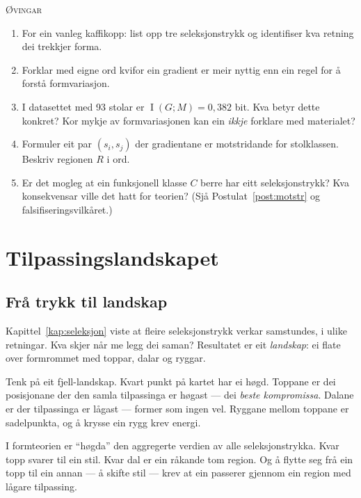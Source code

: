 \documentclass[10pt]{book}
\theoremstyle{definition}
\theoremstyle{plain}
\theoremstyle{remark}
\newenvironment{ovingar}%
  {\medskip\noindent\textsc{\O vingar}\begin{enumerate}[leftmargin=2em]}%
  {\end{enumerate}\medskip}
\DeclareMathOperator{\MI}{I}
\begin{document}
\begin{ovingar}
  \item[\textbf{a)}] For ein vanleg kaffikopp: list opp tre seleksjonstrykk og identifiser kva retning dei trekkjer forma.
  \item[\textbf{a)}] Forklar med eigne ord kvifor ein gradient er meir nyttig enn ein regel for \aa{} forst\aa{} formvariasjon.
  \item[\textbf{b)}] I datasett\-et med 93 stolar er $\MI(G; M) = 0{,}382$ bit. Kva betyr dette konkret? Kor mykje av formvariasjonen kan ein \emph{ikkje} forklare med materialet?
  \item[\textbf{b)}] Formuler eit par $(s_i, s_j)$ der gradientane er motstridande for stolklassen. Beskriv regionen $R$ i ord.
  \item[\textbf{c)}] Er det mogleg at ein funksjonell klasse $C$ berre har eitt seleksjonstrykk? Kva konsekvensar ville det hatt for teorien? (Sjå Postulat~\ref{post:motstr} og falsifiseringsvilk\aa ret.)
\end{ovingar}


\chapter{Tilpassingslandskapet}\label{kap:landskap}

\section{Fr\aa{} trykk til landskap}\label{sec:landskap:intuisjon}

Kapittel~\ref{kap:seleksjon} viste at fleire seleksjonstrykk verkar samstundes, i ulike retningar. Kva skjer n\aa r me legg dei saman? Resultatet er eit \emph{landskap}: ei flate over formrommet med toppar, dalar og ryggar.

Tenk p\aa{} eit fjell-landskap. Kvart punkt p\aa{} kartet har ei h\o gd. Toppane er dei posisjonane der den samla tilpassinga er h\o gast --- dei \emph{beste kompromissa}. Dalane er der tilpassinga er l\aa gast --- former som ingen vel. Ryggane mellom toppane er sadelpunkta, og \aa{} krysse ein rygg krev energi.

I formteorien er ``h\o gda'' den aggregerte verdien av alle seleksjonstrykka. Kvar topp svarer til ein stil. Kvar dal er ein r\aa kande tom region. Og \aa{} flytte seg fr\aa{} ein topp til ein annan --- \aa{} skifte stil --- krev at ein passerer gjennom ein region med l\aa gare tilpassing.
\end{document}

